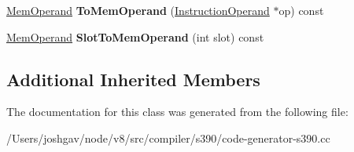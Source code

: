 \begin{DoxyCompactItemize}
\item 
\hyperlink{classv8_1_1internal_1_1_mem_operand}{Mem\+Operand} {\bfseries To\+Mem\+Operand} (\hyperlink{classv8_1_1internal_1_1compiler_1_1_instruction_operand}{Instruction\+Operand} $\ast$op) const \hypertarget{classv8_1_1internal_1_1compiler_1_1_s390_operand_converter_acd206df1655e0373cd15bf99291c476f}{}\label{classv8_1_1internal_1_1compiler_1_1_s390_operand_converter_acd206df1655e0373cd15bf99291c476f}

\item 
\hyperlink{classv8_1_1internal_1_1_mem_operand}{Mem\+Operand} {\bfseries Slot\+To\+Mem\+Operand} (int slot) const \hypertarget{classv8_1_1internal_1_1compiler_1_1_s390_operand_converter_a2ddd9c255909de3545af40fa05c6bc35}{}\label{classv8_1_1internal_1_1compiler_1_1_s390_operand_converter_a2ddd9c255909de3545af40fa05c6bc35}

\end{DoxyCompactItemize}
\subsection*{Additional Inherited Members}


The documentation for this class was generated from the following file\+:\begin{DoxyCompactItemize}
\item 
/\+Users/joshgav/node/v8/src/compiler/s390/code-\/generator-\/s390.\+cc\end{DoxyCompactItemize}

